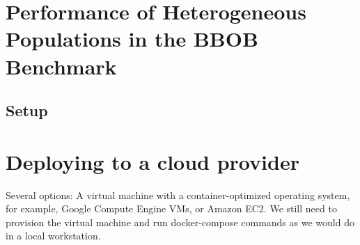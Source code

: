 \documentclass[review]{elsarticle}
\begin{document}
\section{Performance of Heterogeneous Populations in the BBOB Benchmark}
\label{sec:exp2}

\subsection{Setup}








\section{Deploying to a cloud provider}

%
Several options:
    A virtual machine with a container-optimized operating system, for example,
     Google Compute Engine VMs, or Amazon EC2.  We still need to provision the
      virtual machine and run docker-compose commands as we would do in a local 
      workstation. %
    
\end{document}

